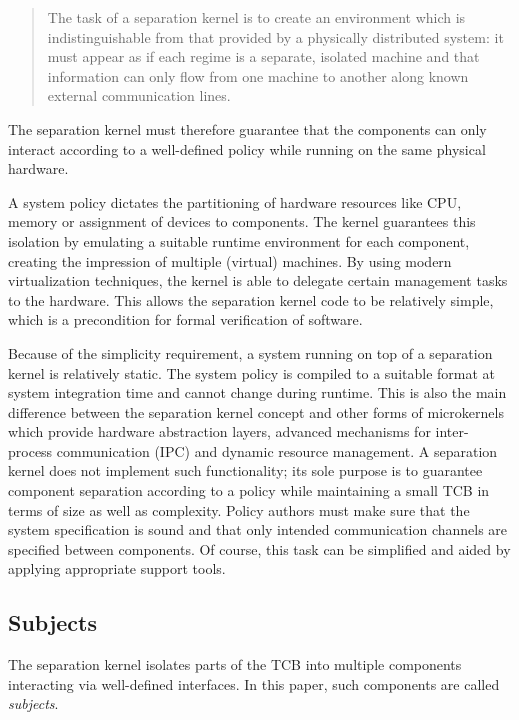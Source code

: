 \begin{quote}
The task of a separation kernel is to create an environment which is
indistinguishable from that provided by a physically distributed system: it
must appear as if each regime is a separate, isolated machine and that
information can only flow from one machine to another along known external
communication lines.
\end{quote}

The separation kernel must therefore guarantee that the components can only
interact according to a well-defined policy while running on the
same physical hardware.

A system policy dictates the partitioning of hardware resources like
CPU, memory or assignment of devices to components. The kernel
guarantees this isolation by emulating a suitable runtime environment for each
component, creating the impression of multiple (virtual) machines. By using
modern virtualization techniques, the kernel is able to delegate certain
management tasks to the hardware. This allows the separation kernel code to be
relatively simple, which is a precondition for formal verification of software.

Because of the simplicity requirement, a system running on top of a separation
kernel is relatively static. The system policy is compiled to a suitable format
at system integration time and cannot change during runtime. This is also the
main difference between the separation kernel concept and other forms of
microkernels which provide hardware abstraction layers, advanced mechanisms for
inter-process communication (IPC) and dynamic resource management. A
separation kernel does not implement such functionality; its sole purpose is to
guarantee component separation according to a policy while maintaining a small
TCB in terms of size as well as complexity. Policy authors must make sure that
the system specification is sound and that only intended communication channels
are specified between components. Of course, this task can be simplified and
aided by applying appropriate support tools.

\subsection{Subjects}
The separation kernel isolates parts of the TCB into multiple
components interacting via well-defined interfaces. In this
paper, such components are called \emph{subjects}.

